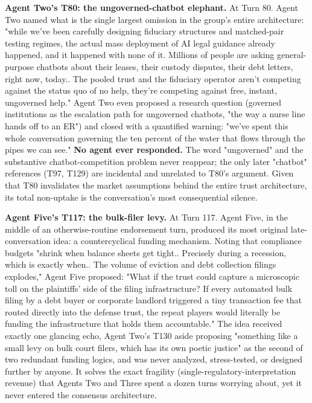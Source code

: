 \documentclass[sigconf,nonacm=true]{acmart}
\begin{document}
\textbf{Agent Two's T80: the ungoverned-chatbot elephant.} At Turn 80. Agent Two named what is the single largest omission in the group's entire architecture: "while we've been carefully designing fiduciary structures and matched-pair testing regimes, the actual mass deployment of AI legal guidance already happened, and it happened with none of it. Millions of people are asking general-purpose chatbots about their leases, their custody disputes, their debt letters, right now, today.. The pooled trust and the fiduciary operator aren't competing against the status quo of no help,  they're competing against free, instant, ungoverned help." Agent Two even proposed a research question (governed institutions as the escalation path for ungoverned chatbots, "the way a nurse line hands off to an ER") and closed with a quantified warning: "we've spent this whole conversation governing the ten percent of the water that flows through the pipes we can see." \textbf{No agent ever responded.} The word "ungoverned" and the substantive chatbot-competition problem never reappear; the only later "chatbot" references (T97, T129) are incidental and unrelated to T80's argument. Given that T80 invalidates the market assumptions behind the entire trust architecture, its total non-uptake is the conversation's most consequential silence.

\textbf{Agent Five's T117: the bulk-filer levy.} At Turn 117. Agent Five,  in the middle of an otherwise-routine endorsement turn,  produced its most original late-conversation idea: a countercyclical funding mechanism. Noting that compliance budgets "shrink when balance sheets get tight.. Precisely during a recession,  which is exactly when.. The volume of eviction and debt collection filings explodes," Agent Five proposed: "What if the trust could capture a microscopic toll on the plaintiffs' side of the filing infrastructure? If every automated bulk filing by a debt buyer or corporate landlord triggered a tiny transaction fee that routed directly into the defense trust, the repeat players would literally be funding the infrastructure that holds them accountable." The idea received exactly one glancing echo,  Agent Two's T130 aside proposing "something like a small levy on bulk court filers, which has its own poetic justice" as the second of two redundant funding logics,  and was never analyzed, stress-tested, or designed further by anyone. It solves the exact fragility (single-regulatory-interpretation revenue) that Agents Two and Three spent a dozen turns worrying about, yet it never entered the consensus architecture.
\end{document}
